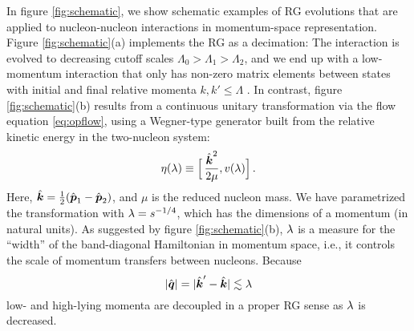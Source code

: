 In figure \ref{fig:schematic}, we show schematic examples of RG evolutions that are applied to
nucleon-nucleon interactions in momentum-space representation. Figure \ref{fig:schematic}(a) 
implements the RG as a decimation: The interaction is evolved to decreasing
cutoff scales $\Lambda_0 > \Lambda_1 > \Lambda_2$, and we end up with a low-momentum interaction
\Vlowk{} that only has non-zero matrix elements between states with initial and final 
relative momenta $k,k'\leq\Lambda$ \cite{Bogner:2003os,Bogner:2010pq}. In contrast, 
figure \ref{fig:schematic}(b) results from a continuous unitary transformation via the flow 
equation \eqref{eq:opflow}, using a Wegner-type generator built from the relative kinetic 
energy in the two-nucleon system:
\begin{equation}\label{eq:def_srg_generator}
  \eta(\lambda) \equiv \Big[\,\frac{\kOV^2}{2\mu}, v(\lambda)\Big]\,.
\end{equation}
Here, $\kOV=\tfrac{1}{2}(\pOV_1-\pOV_2)$, and $\mu$ is the reduced nucleon mass. We have
parametrized the transformation with $\lambda=s^{-1/4}$, which has the 
dimensions of a momentum (in natural units). As suggested by figure \ref{fig:schematic}(b),
$\lambda$ is a measure for the ``width'' of the band-diagonal Hamiltonian in momentum 
space, i.e., it controls the scale of momentum transfers between nucleons. Because  
\begin{equation}
  |\qOV|=|\kOV' - \kOV|\lesssim \lambdaSRG
\end{equation}
low- and high-lying momenta are decoupled in a proper RG sense as $\lambda$ is 
decreased.


